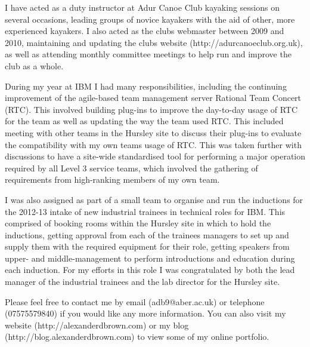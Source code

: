\documentclass[10pt,stdletter,dateno,sigleft]{newlfm} %
\begin{document}
\begin{newlfm}
I have acted as a duty instructor at Adur Canoe Club kayaking sessions on several occasions, leading groups of novice kayakers with the aid of other, more experienced kayakers. I also acted as the clubs webmaster between 2009 and 2010, maintaining and updating the clubs website (http://adurcanoeclub.org.uk), as well as attending monthly committee meetings to help run and improve the club as a whole.

During my year at IBM I had many responsibilities, including the continuing improvement of the agile-based team management server Rational Team Concert (RTC). This involved building plug-ins to improve the day-to-day usage of RTC for the team as well as updating the way the team used RTC. This included meeting with other teams in the Hursley site to discuss their plug-ins to evaluate the compatibility with my own teams usage of RTC. This was taken further with discussions to have a site-wide standardised tool for performing a major operation required by all Level 3 service teams, which involved the gathering of requirements from high-ranking members of my own team.

I was also assigned as part of a small team to organise and run the inductions for the 2012-13 intake of new industrial trainees in technical roles for IBM. This comprised of booking rooms within the Hursley site in which to hold the inductions, getting approval from each of the trainees managers to set up and supply them with the required equipment for their role, getting speakers from upper- and middle-management to perform introductions and education during each induction. For my efforts in this role I was congratulated by both the lead manager of the industrial trainees and the lab director for the Hursley site.

Please feel free to contact me by email (adb9@aber.ac.uk) or telephone (07575579840) if you would like any more information. You can also visit my website (http://alexanderdbrown.com) or my blog\\ (http://blog.alexanderdbrown.com) to view some of my online portfolio.



 

\end{newlfm}
\end{document}
